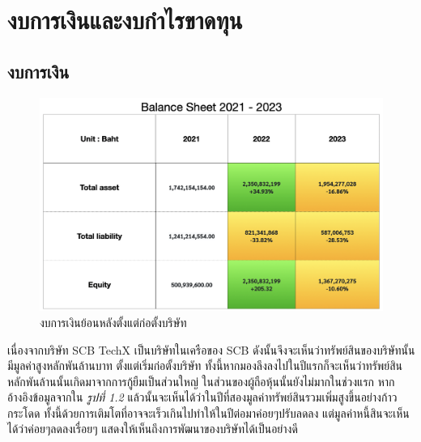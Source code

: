 \clearpage

\section{งบการเงินและงบกำไรขาดทุน}
\subsection{งบการเงิน}
\begin{figure}[ht]
    \begin{center}
        \includegraphics[scale=0.4]{images/balance.png}
    \end{center}
    \caption[งบการเงินย้อนหลังตั้งแต่ก่อตั้งบริษัท]{งบการเงินย้อนหลังตั้งแต่ก่อตั้งบริษัท}
\end{figure}
เนื่องจากบริษัท SCB TechX เป็นบริษัทในเครือของ SCB ดังนั้นจึงจะเห็นว่าทรัพย์สินของบริษัทนั้นมีมูลค่าสูงหลักพันล้านบาท ตั้งแต่เริ่มก่อตั้งบริษัท ทั้งนี้หากมองลึงลงไปในปีแรกก็จะเห็นว่าทรัพย์สินหลักพันล้านนั้นเกิดมาจากการกู้ยืมเป็นส่วนใหญ่ ในส่วนของผู้ถือหุ้นนั้นยังไม่มากในช่วงแรก หากอ้างอิงข้อมูลจากใน \textit{รูปที่ 1.2 }แล้วนั้นจะเห็นได้ว่าในปีที่สองมูลค่าทรัพย์สินรวมเพิ่มสูงขึ้นอย่างก้าวกระโดด ทั้งนี้ด้วยการเติมโตที่อาจจะเร็วเกินไปทำให้ในปีต่อมาค่อยๆปรับลดลง  แต่มูลค่าหนี้สินจะเห็นได้ว่าค่อยๆลดลงเรื่อยๆ แสดงให้เห็นถึงการพัฒนาของบริษัทได้เป็นอย่างดี

\clearpage

